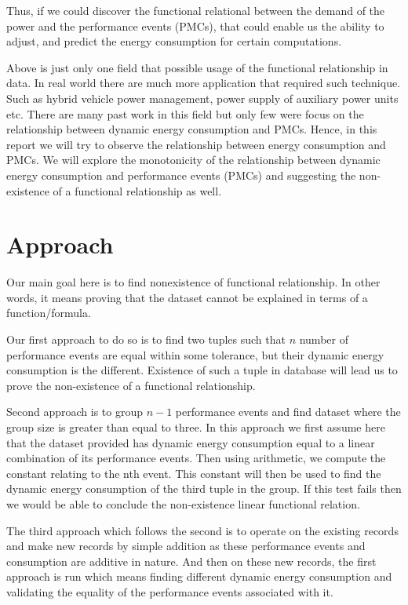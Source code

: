 Thus, if we could discover the functional relational between the demand of the power and the performance events (PMCs), that could enable us the ability to adjust, and predict the energy consumption for certain computations.

Above is just only one field that possible usage of the functional relationship in data. In real world there are much more application that required such technique. Such as hybrid vehicle power management, power supply of auxiliary power units etc. There are many past work in this field but only few were focus on the relationship between dynamic energy consumption and PMCs. Hence, in this report we will try to observe the relationship between energy consumption and PMCs. We will explore the monotonicity of the relationship between dynamic energy consumption and performance events (PMCs) and suggesting the non-existence of a functional relationship as well.

\section{Approach}
Our main goal here is to find nonexistence of functional relationship. In other words, it means proving that the dataset cannot be explained in terms of a function/formula.

Our first approach to do so is to find two tuples such that \(n\) number of performance events are equal within some tolerance, but their dynamic energy consumption is the different. Existence of such a tuple in database will lead us to prove the non-existence of a functional relationship.

Second approach is to group \(n-1\) performance events and find dataset where the group size is greater than equal to three. In this approach we first assume here that the dataset provided has dynamic energy consumption equal to a linear combination of its performance events. Then using arithmetic, we compute the constant relating to the nth event. This constant will then be used to find the dynamic energy consumption of the third tuple in the group. If this test fails then we would be able to conclude the non-existence linear functional relation.

The third approach which follows the second is to operate on the existing records and make new records by simple addition as these performance events and consumption are additive in nature. And then on these new records, the first approach is run which means finding different dynamic energy consumption and validating the equality of the performance events associated with it.

